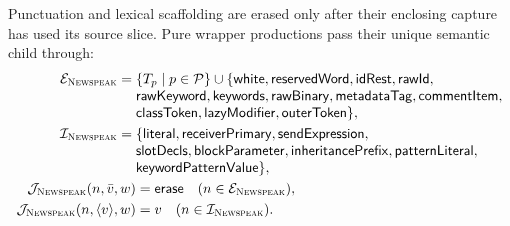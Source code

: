 Punctuation and lexical scaffolding are erased only after their enclosing
capture has used its source slice.  Pure wrapper productions pass their unique
semantic child through:
\begin{equation}\label{eq:newspeak-structural-actions}
\begin{aligned}
 \mathcal E_{\textsc{Newspeak}}={}&\{T_p\mid p\in\mathcal P\}\cup\{\mathsf{white},
   \mathsf{reservedWord},\mathsf{idRest},\mathsf{rawId},\\[-1mm]
 &\mathsf{rawKeyword},\mathsf{keywords},\mathsf{rawBinary},
   \mathsf{metadataTag},\mathsf{commentItem},\\[-1mm]
 &\mathsf{classToken},\mathsf{lazyModifier},\mathsf{outerToken}\},\\
 \mathcal I_{\textsc{Newspeak}}={}&\{\mathsf{literal},\mathsf{receiverPrimary},
   \mathsf{sendExpression},\\[-1mm]
 &\mathsf{slotDecls},\mathsf{blockParameter},\mathsf{inheritancePrefix},
   \mathsf{patternLiteral},\\[-1mm]
 &\mathsf{keywordPatternValue}\},\\
 \mathcal J_{\textsc{Newspeak}}(n,\bar v,w)&=\mathsf{erase}
      \quad(n\in\mathcal E_{\textsc{Newspeak}}),\\
 \mathcal J_{\textsc{Newspeak}}(n,\langle v\rangle,w)&=v
      \quad(n\in\mathcal I_{\textsc{Newspeak}}).
\end{aligned}
\end{equation}

